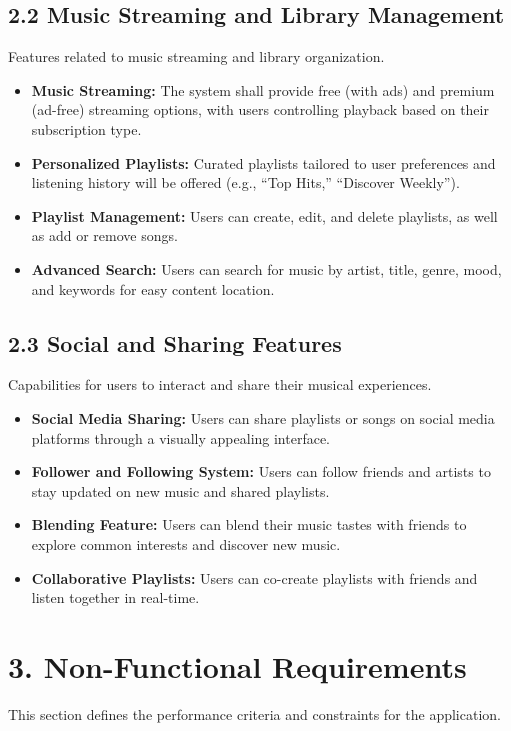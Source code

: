 \documentclass[a4paper,10pt]{article}
\begin{document}
\subsection*{2.2 Music Streaming and Library Management}
Features related to music streaming and library organization.

\begin{itemize}[leftmargin=*]
    \item \textbf{Music Streaming:} The system shall provide free (with ads) and premium (ad-free) streaming options, with users controlling playback based on their subscription type.
    \item \textbf{Personalized Playlists:} Curated playlists tailored to user preferences and listening history will be offered (e.g., “Top Hits,” “Discover Weekly”).
    \item \textbf{Playlist Management:} Users can create, edit, and delete playlists, as well as add or remove songs.
    \item \textbf{Advanced Search:} Users can search for music by artist, title, genre, mood, and keywords for easy content location.
\end{itemize}

\subsection*{2.3 Social and Sharing Features}
Capabilities for users to interact and share their musical experiences.

\begin{itemize}[leftmargin=*]
    \item \textbf{Social Media Sharing:} Users can share playlists or songs on social media platforms through a visually appealing interface.
    \item \textbf{Follower and Following System:} Users can follow friends and artists to stay updated on new music and shared playlists.
    \item \textbf{Blending Feature:} Users can blend their music tastes with friends to explore common interests and discover new music.
    \item \textbf{Collaborative Playlists:} Users can co-create playlists with friends and listen together in real-time.
\end{itemize}

\section*{3. Non-Functional Requirements}
This section defines the performance criteria and constraints for the application.
\end{document}
